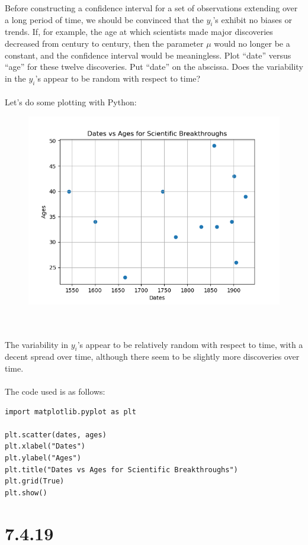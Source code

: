 \documentclass{article}
\begin{document}
{Before constructing a confidence interval for a set of observations extending over a long period of time, we should be convinced that the \(y_i\)'s exhibit no biases or trends. If, for example, the age at which scientists made major discoveries decreased from century to century, then the parameter \(\mu\) would no longer be a constant, and the confidence interval would be meaningless. Plot “date” versus “age” for these twelve discoveries. Put “date” on the abscissa. Does the variability in the \(y_i\)'s appear to be random with respect to time?
\\
\\
Let's do some plotting with Python: 
\begin{figure}[h!]
  \centering
  \includegraphics[width=500pt]{science.png}
\end{figure}
\\
\\
The variability in \(y_i\)'s appear to be relatively random with respect to time, with a decent spread over time, although there seem to be slightly more discoveries over time.
\\
\\
The code used is as follows:
\begin{verbatim}
import matplotlib.pyplot as plt

plt.scatter(dates, ages)
plt.xlabel("Dates")
plt.ylabel("Ages")
plt.title("Dates vs Ages for Scientific Breakthroughs")
plt.grid(True)
plt.show()
\end{verbatim}

\section*{7.4.19}

}
\end{document}
